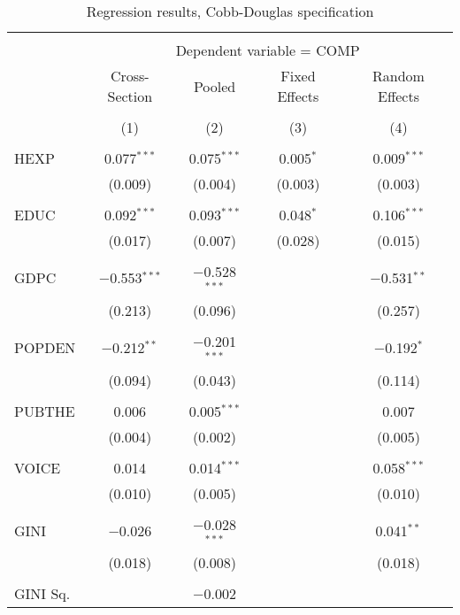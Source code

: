 \documentclass[12pt,a4paper]{article}\usepackage[]{graphicx}\usepackage[]{color}
\begin{document}
\begin{table}[!htbp] \centering 
  \caption{Regression results, Cobb-Douglas specification} 
  \label{tab:bigcb} 
\footnotesize 
\begin{tabular}{@{\extracolsep{5pt}}lcccc} 
\\[-1.8ex]\hline 
\hline \\[-1.8ex] 
 & \multicolumn{4}{c}{Dependent variable = COMP} \\ 
\cline{2-5} 
 & Cross-Section & Pooled & Fixed Effects & Random Effects \\ 
\\[-1.8ex] & (1) & (2) & (3) & (4)\\ 
\hline \\[-1.8ex] 
 HEXP & 0.077$^{***}$ & 0.075$^{***}$ & 0.005$^{*}$ & 0.009$^{***}$ \\ 
  & (0.009) & (0.004) & (0.003) & (0.003) \\ 
  & & & & \\ 
 EDUC & 0.092$^{***}$ & 0.093$^{***}$ & 0.048$^{*}$ & 0.106$^{***}$ \\ 
  & (0.017) & (0.007) & (0.028) & (0.015) \\ 
  & & & & \\ 
 GDPC & $-$0.553$^{***}$ & $-$0.528$^{***}$ &  & $-$0.531$^{**}$ \\ 
  & (0.213) & (0.096) &  & (0.257) \\ 
  & & & & \\ 
 POPDEN & $-$0.212$^{**}$ & $-$0.201$^{***}$ &  & $-$0.192$^{*}$ \\ 
  & (0.094) & (0.043) &  & (0.114) \\ 
  & & & & \\ 
 PUBTHE & 0.006 & 0.005$^{***}$ &  & 0.007 \\ 
  & (0.004) & (0.002) &  & (0.005) \\ 
  & & & & \\ 
 VOICE & 0.014 & 0.014$^{***}$ &  & 0.058$^{***}$ \\ 
  & (0.010) & (0.005) &  & (0.010) \\ 
  & & & & \\ 
 GINI & $-$0.026 & $-$0.028$^{***}$ &  & 0.041$^{**}$ \\ 
  & (0.018) & (0.008) &  & (0.018) \\ 
  & & & & \\ 
 GINI Sq. &  & $-$0.002 &  &  \\ 

\end{tabular}
\end{table}
\end{document}
